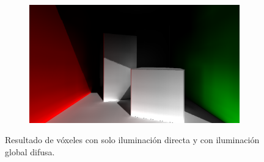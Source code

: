 \begin{figure}[H]
\begin{subfigure}[t]{0.49\textwidth}
	\end{subfigure}%
	\hspace{0.01\textwidth}
	\begin{subfigure}[t]{0.49\textwidth}
		\centering
		\includegraphics[width=\linewidth]{media/c_voxel_gi.png}
	\end{subfigure}%
	\caption{Resultado de vóxeles con solo iluminación directa y con iluminación global difusa.}
	\label{fig:vgi_scenes}
\end{figure}
